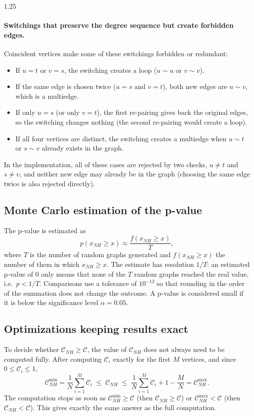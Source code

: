 \documentclass[12pt]{article}
\newcommand{\metric}{\mathcal{C}}
\newcommand{\pval}{p(x_{NH} \geq x)}
\begin{document}
\begin{spacing}{1.25}
\paragraph{Switchings that preserve the degree sequence but create forbidden edges.}
Coincident vertices make some of these switchings forbidden or redundant:
\begin{itemize}
    \item If $u = t$ or $v = s$, the switching creates a loop ($u \sim u$ or $v \sim v$).
    \item If the same edge is chosen twice ($u = s$ and $v = t$), both new edges are $u \sim v$, which is a multiedge.
    \item If only $u = s$ (or only $v = t$), the first re-pairing gives back the original edges, so the switching changes nothing (the second re-pairing would create a loop).
    \item If all four vertices are distinct, the switching creates a multiedge when $u \sim t$ or $s \sim v$ already exists in the graph.
\end{itemize}
In the implementation, all of these cases are rejected by two checks, $u \neq t$ and $s \neq v$, and neither new edge may already be in the graph (choosing the same edge twice is also rejected directly).

\subsection{Monte Carlo estimation of the p-value}
The p-value is estimated as
\begin{equation}
    \pval \approx \frac{f(x_{NH} \geq x)}{T},
\end{equation}
where $T$ is the number of random graphs generated and $f(x_{NH} \geq x)$ the number of them in which $x_{NH} \geq x$. The estimate has resolution $1/T$: an estimated p-value of $0$ only means that none of the $T$ random graphs reached the real value, i.e.\ $p < 1/T$. Comparisons use a tolerance of $10^{-12}$ so that rounding in the order of the summation does not change the outcome. A p-value is considered small if it is below the significance level $\alpha = 0.05$.

\subsection{Optimizations keeping results exact}
To decide whether $\metric_{NH} \geq \metric$, the value of $\metric_{NH}$ does not always need to be computed fully. After computing $\metric_i$ exactly for the first $M$ vertices, and since $0 \leq \metric_i \leq 1$,
\begin{equation}
    \metric^{\min}_{NH} = \frac{1}{N}\sum_{i=1}^{M} \metric_i \;\leq\; \metric_{NH} \;\leq\; \frac{1}{N}\sum_{i=1}^{M} \metric_i + 1 - \frac{M}{N} = \metric^{\max}_{NH}.
\end{equation}
The computation stops as soon as $\metric^{\min}_{NH} \geq \metric$ (then $\metric_{NH} \geq \metric$) or $\metric^{\max}_{NH} < \metric$ (then $\metric_{NH} < \metric$). This gives exactly the same answer as the full computation.


\end{spacing}
\end{document}
